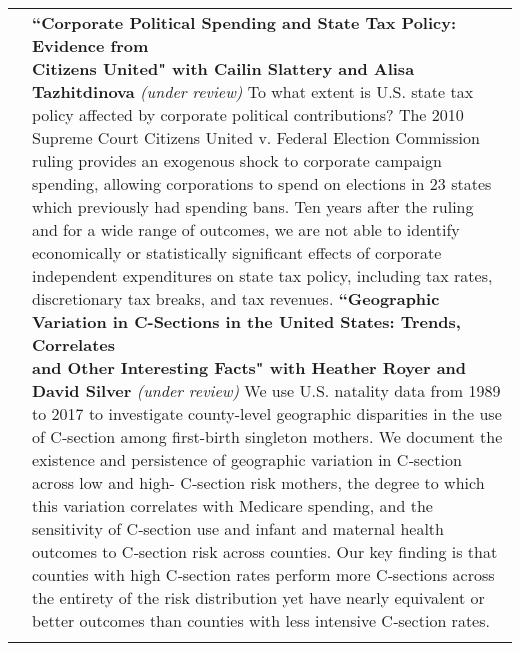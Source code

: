 \documentclass[11pt]{article}
\begin{document}
\begin{tabularx}{\textwidth}{@{}Y Z@{}}
	&
	\textbf{``Corporate Political Spending and State Tax Policy: Evidence from \newline  Citizens United" with Cailin Slattery and Alisa Tazhitdinova} \textit{(under review)} \newline
	\vspace{-8pt} \newline
	To what extent is U.S. state tax policy affected by corporate political contributions? The 2010 Supreme Court Citizens United v. Federal Election Commission ruling provides an exogenous shock to corporate campaign spending, allowing corporations to spend on elections in 23 states which previously had spending bans. Ten years after the ruling and for a wide range of outcomes, we are not able to identify economically or statistically significant effects of corporate independent expenditures on state tax policy, including tax rates, discretionary tax breaks, and tax revenues. \href{https://www.s-robinson.com/research/Slattery_Tazhitdinova_Robinson_Citizens_United.pdf}{\color{blue}{[Link to paper]}}
	\vspace{20pt} \newline
	\textbf{``Geographic Variation in C-Sections in the United States: Trends, Correlates \newline and Other Interesting Facts" with Heather Royer and David Silver} \textit{(under review)} 
	\vspace{-8pt} \newline
	We use U.S. natality data from 1989 to 2017 to investigate county-level geographic disparities in the use of C‑section among ﬁrst-birth singleton mothers. We document the existence and persistence of geographic variation in C‑section across low and high- C‑section risk mothers, the degree to which this variation correlates with Medicare spending, and the sensitivity of C‑section use and infant and maternal health outcomes to C‑section risk across counties. Our key ﬁnding is that counties with high C‑section rates perform more C‑sections across the entirety of the risk distribution yet have nearly equivalent or better outcomes than counties with less intensive C‑section rates.  \href{https://www.s-robinson.com/research/Robinson_Royer_Silver_CSection.pdf}{\color{blue}{[Link to paper]}}
	\vspace{0pt}
	\\ \addlinespace[20pt] 
	


\end{tabularx}
\end{document}
